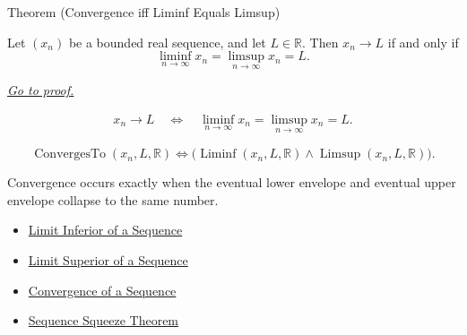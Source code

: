 \begin{theorembox}{Theorem (Convergence iff Liminf Equals Limsup)}
\begin{theorem}
\label{thm:convergence-iff-liminf-equals-limsup}
Let $(x_n)$ be a bounded real sequence, and let $L\in\mathbb{R}$. Then
$x_n\to L$ if and only if
\[
  \liminf_{n\to\infty}x_n
  =
  \limsup_{n\to\infty}x_n
  =
  L.
\]

\smallskip
\noindent
\hyperref[prf:convergence-iff-liminf-equals-limsup]{\textit{Go to proof.}}
\end{theorem}
\end{theorembox}

\begin{remark*}
\[
\begin{aligned}
x_n\to L
\quad\Longleftrightarrow\quad
\liminf_{n\to\infty}x_n
=
\limsup_{n\to\infty}x_n
=L.
\end{aligned}
\]
\end{remark*}

\begin{remark*}
\[
\operatorname{ConvergesTo}(x_n,L,\mathbb{R})
\Longleftrightarrow
\bigl(
  \operatorname{Liminf}(x_n,L,\mathbb{R})
  \land
  \operatorname{Limsup}(x_n,L,\mathbb{R})
\bigr).
\]
\end{remark*}

\begin{remark*}[Interpretation]
Convergence occurs exactly when the eventual lower envelope and eventual
upper envelope collapse to the same number.
\end{remark*}

\begin{dependencies}
\begin{itemize}
  \item \hyperref[def:liminf-sequence]{Limit Inferior of a Sequence}
  \item \hyperref[def:limsup-sequence]{Limit Superior of a Sequence}
  \item \hyperref[def:convergent-sequence]{Convergence of a Sequence}
  \item \hyperref[thm:sequence-squeeze-theorem]{Sequence Squeeze Theorem}
\end{itemize}
\end{dependencies}

